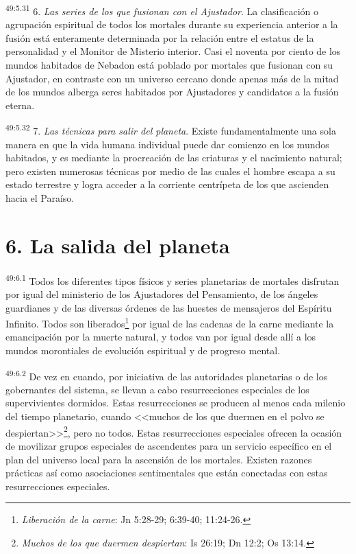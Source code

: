 \par
\textsuperscript{49:5.31} 6. \textit{Las series de los que fusionan con el Ajustador}. La clasificación o agrupación espiritual de todos los mortales durante su experiencia anterior a la fusión está enteramente determinada por la relación entre el estatus de la personalidad y el Monitor de Misterio interior. Casi el noventa por ciento de los mundos habitados de Nebadon está poblado por mortales que fusionan con su Ajustador, en contraste con un universo cercano donde apenas más de la mitad de los mundos alberga seres habitados por Ajustadores y candidatos a la fusión eterna.

\par
\textsuperscript{49:5.32} 7. \textit{Las técnicas para salir del planeta}. Existe fundamentalmente una sola manera en que la vida humana individual puede dar comienzo en los mundos habitados, y es mediante la procreación de las criaturas y el nacimiento natural; pero existen numerosas técnicas por medio de las cuales el hombre escapa a su estado terrestre y logra acceder a la corriente centrípeta de los que ascienden hacia el Paraíso.

\section*{6. La salida del planeta}
\par
\textsuperscript{49:6.1} Todos los diferentes tipos físicos y series planetarias de mortales disfrutan por igual del ministerio de los Ajustadores del Pensamiento, de los ángeles guardianes y de las diversas órdenes de las huestes de mensajeros del Espíritu Infinito. Todos son liberados\footnote{\textit{Liberación de la carne}: Jn 5:28-29; 6:39-40; 11:24-26.} por igual de las cadenas de la carne mediante la emancipación por la muerte natural, y todos van por igual desde allí a los mundos morontiales de evolución espiritual y de progreso mental.

\par
\textsuperscript{49:6.2} De vez en cuando, por iniciativa de las autoridades planetarias o de los gobernantes del sistema, se llevan a cabo resurrecciones especiales de los supervivientes dormidos. Estas resurrecciones se producen al menos cada milenio del tiempo planetario, cuando <<muchos de los que duermen en el polvo se despiertan>>\footnote{\textit{Muchos de los que duermen despiertan}: Is 26:19; Dn 12:2; Os 13:14.}, pero no todos. Estas resurrecciones especiales ofrecen la ocasión de movilizar grupos especiales de ascendentes para un servicio específico en el plan del universo local para la ascensión de los mortales. Existen razones prácticas así como asociaciones sentimentales que están conectadas con estas resurrecciones especiales.

